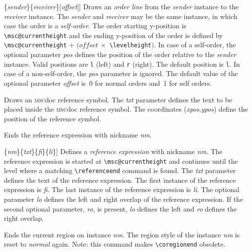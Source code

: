\documentclass[a4paper]{article}
\newcommand{\cmd}[1]{\texttt{\bslash #1}}
\newcommand{\acro}[1]{{\scshape\lowercase{#1}}}
\newcommand\MSC{\acro{MSC}}
\newcommand{\MSCdoc}{\MSC{}doc}
\newcommand{\opt}[1]{[#1]}
\newcommand{\cmdarg}[1]{\{\emph{#1}\}}
\newcommand{\coordarg}[1]{\emph{#1}}
\newcommand{\coordargs}[2]{(\coordarg{#1},\coordarg{#2})}
\newenvironment{defs}{%
  \begin{list}{}%
              {\setlength{\labelwidth}{0pt}%
               \setlength{\labelsep}{1em}%
               \setlength{\leftmargin}{1em}%
               \setlength{\parsep}{1ex}%
               \setlength{\listparindent}{0pt}%
               \setlength{\rightmargin}{0pt}%
               \renewcommand{\makelabel}[1]{##1}%
               \raggedright%
              }%
  }{%
  \end{list}}
\begin{document}
\begin{defs}
\item[\cmd{order}\opt{\emph{pos}}\{\emph{sender}\}\{\emph{receiver}\}\opt{\emph{offset}}]
Draws an \emph{order line} from the \emph{sender} instance to the
\emph{receiver} instance. The \emph{sender} and \emph{receiver} may be
the same instance, in which case the order is a \emph{self-order}. The
order starting y-position is \verb|\msc@currentheight| and the ending
y-position of the order is defined by \verb|\msc@currentheight| $+$
$(\textit{offset}\ \times $ \verb|\levelheight|$)$. In case of a
self-order, the optional parameter \emph{pos} defines the position of
the order relative to the \emph{sender} instance. Valid positions are
\verb|l| (left) and \verb|r| (right). The default position is
\verb|l|. In case of a non-self-order, the \emph{pos} parameter is
ignored. The default value of the optional parameter \emph{offset}
is~0 for normal orders and~1 for self orders.

\item[\cmd{reference}\cmdarg{txt}\coordargs{xpos}{ypos}] Draws an
\MSCdoc{} reference symbol. The \emph{txt} parameter defines the text to
be placed inside the \MSCdoc{} reference symbol. The coordinates
\coordargs{xpos}{ypos} define the position of the reference symbol.

\item[\cmd{referenceend}\{\emph{nm}\}] Ends the reference expression with
nickname \emph{nm}.

\item[\cmd{referencestart}\opt{\emph{lo}}\opt{\emph{ro}}\{\emph{nm}\}\{\emph{txt}\}\{\emph{fi}\}\{\emph{li}\}]
Defines a \emph{reference expression} with nickname \emph{nm}. The
reference expression is started at \verb|\msc@currentheight| and
continues until the level where a matching \verb|\referenceend| command
is found.  The \emph{txt} parameter defines the text of the reference
expression.  The first instance of the reference expression is
\emph{fi}. The last instance of the reference expression is
\emph{li}. The optional parameter \emph{lo} defines the left and right
overlap of the reference expression. If the second optional parameter,
\emph{ro}, is present, \emph{lo} defines the left and \emph{ro}
defines the right overlap.

\item[\cmd{regionend}\{\emph{nm}\}] Ends the current region on
instance \emph{nm}. The region style of the instance \emph{nm} is
reset to \emph{normal} again. Note: this command makes
\verb|\coregionend| obsolete.


\end{defs}
\end{document}

